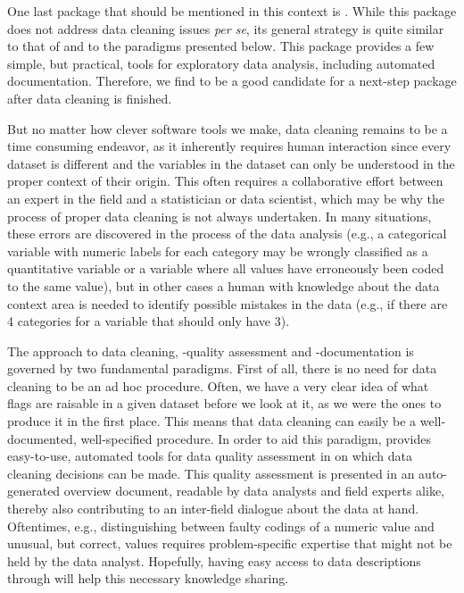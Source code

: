 \documentclass[article,shortnames]{jss}
\begin{document}
One last package that should be mentioned in this context is
 \citep{DataExplorer}. While this package does not
address data cleaning issues \emph{per se}, its general strategy is
quite similar to that of  and to the paradigms presented
below. This package provides a few simple, but practical, tools for
exploratory data analysis, including automated
documentation. Therefore, we find  to be a good
candidate for a next-step package after data cleaning is finished.

But no matter how clever software tools we make, data cleaning remains
to be a time consuming endeavor, as it inherently requires human
interaction since every dataset is different and the variables in the
dataset can only be understood in the proper context of their
origin. This often requires a collaborative effort between an expert
in the field and a statistician or data scientist, which may be why
the process of proper data cleaning is not always undertaken. In many
situations, these errors are discovered in the process of the data
analysis (e.g., a categorical variable with numeric labels for each
category may be wrongly classified as a quantitative variable or a
variable where all values have erroneously been coded to the same
value), but in other cases a human with knowledge about the data
context area is needed to identify possible mistakes in the data
(e.g., if there are 4 categories for a variable that should only have
3).

The  approach to data cleaning, -quality assessment and -documentation is
governed by two fundamental paradigms. First of all, there is no need
for data cleaning to be an ad hoc procedure. Often, we have a very
clear idea of what flags are raisable in a given dataset before we
look at it, as we were the ones to produce it in the first place. This
means that data cleaning can easily be a well-documented,
well-specified procedure. In order to aid this paradigm, 
provides easy-to-use, automated tools for data quality assessment in
 \citep{R} on which data cleaning decisions can be made. This quality
assessment is presented in an auto-generated overview document,
readable by data analysts and field experts alike, thereby also
contributing to an inter-field dialogue about the data at
hand. Oftentimes, e.g., distinguishing between faulty codings of a
numeric value and unusual, but correct, values requires
problem-specific expertise that might not be held by the data
analyst. Hopefully, having easy access to data descriptions through
 will help this necessary knowledge sharing.
\end{document}
